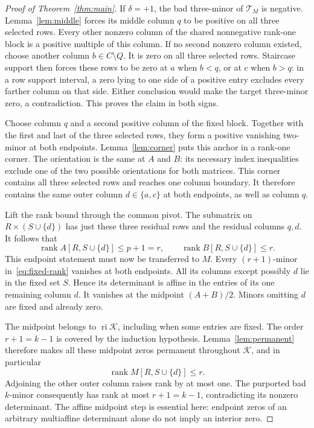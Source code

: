 \documentclass[11pt]{article}
\theoremstyle{definition}
\theoremstyle{remark}
\numberwithin{equation}{section}
\newcommand{\K}{\mathcal K}
\DeclareMathOperator{\rank}{rank}
\DeclareMathOperator{\ri}{ri}
\begin{document}
\begin{proof}[Proof of Theorem~\ref{thm:main}]
If $\delta=+1$, the bad three-minor of $\mathcal T_M$ is
negative. Lemma~\ref{lem:middle} forces its middle column $q$
to be positive on all three selected rows. Every other nonzero
column of the shared nonnegative rank-one block is a positive
multiple of this column. If no second nonzero column existed,
choose another column $b\in C\setminus Q$. It is zero on all
three selected rows. Staircase support then forces these rows
to be zero at $a$ when $b<q$, or at $c$ when $b>q$: in a row
support interval, a zero lying to one side of a positive entry
excludes every farther column on that side. Either conclusion
would make the target three-minor zero, a contradiction. This
proves the claim in both signs.

Choose column $q$ and a second positive column of the fixed
block. Together with the first and last of the three selected
rows, they form a positive vanishing two-minor at both endpoints.
Lemma~\ref{lem:corner} puts this anchor in a rank-one corner.
The orientation is the same at $A$ and $B$: its necessary index
inequalities exclude one of the two possible orientations for
both matrices. This corner contains all three selected rows
and reaches one column boundary. It therefore contains the
same outer column $d\in\{a,c\}$ at both endpoints, as well
as column $q$.

Lift the rank bound through the common pivot. The submatrix
on $R\times(S\cup\{d\})$ has just these three residual rows
and the residual columns $q,d$. It follows that
\begin{equation}\label{eq:fixed-rank}
 \rank A[R,S\cup\{d\}]\leq p+1=r,
 \qquad
 \rank B[R,S\cup\{d\}]\leq r.
\end{equation}
This endpoint statement must now be transferred to $M$.
Every $(r+1)$-minor in~\eqref{eq:fixed-rank} vanishes at both
endpoints. All its columns except possibly $d$ lie in the fixed
set $S$. Hence its determinant is affine in the entries of its
one remaining column $d$. It vanishes at the midpoint
$(A+B)/2$. Minors omitting $d$ are fixed and already zero.

The midpoint belongs to $\ri\K$, including when some entries
are fixed. The order $r+1=k-1$ is covered by the induction
hypothesis. Lemma~\ref{lem:permanent} therefore makes all these
midpoint zeros permanent throughout $\K$, and in particular
\[
 \rank M[R,S\cup\{d\}]\leq r.
\]
Adjoining the other outer column raises rank by at most one.
The purported bad $k$-minor consequently has rank at most
$r+1=k-1$, contradicting its nonzero determinant.
The affine midpoint step is essential here: endpoint zeros of
an arbitrary multiaffine determinant alone do not imply an
interior zero.


\end{proof}
\end{document}
